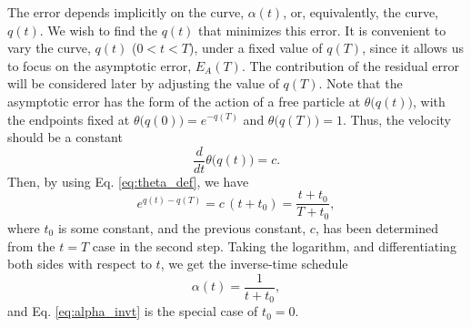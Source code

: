 \documentclass[preprint, superscriptaddress, floatfix]{revtex4-1}
\newcommand{\Err}{E}
\begin{document}
The error depends implicitly on the curve, $\alpha(t)$,
or, equivalently, the curve, $q(t)$.
%
%
We wish to find the $q(t)$
that minimizes this error.
%
It is convenient to
vary the curve, $q(t)$ ($0 < t < T$),
under a fixed value of $q(T)$,
since it allows us to focus on
the asymptotic error, $E_A(T)$.
%
The contribution of the residual error
will be considered later
by adjusting the value of $q(T)$.
%
Note that the asymptotic error
has the form of the action of a free particle
at $\theta\bigl( q(t) \bigr)$,
with the endpoints fixed at
$\theta\bigl( q(0) \bigr)  = e^{- q(T)}$
and
$\theta\bigl( q(T) \bigr) = 1$.
%
Thus, the velocity should be a constant
%
\begin{equation}
  \frac{d}{dt} \theta\bigl( q(t) \bigr) = c
  .
\label{eq:dthetadt_const}
\end{equation}
%
Then, by using Eq. \eqref{eq:theta_def}, we have
%
\begin{equation}
  e^{ q(t) - q(T) }
  =
  c \, (t + t_0)
  =
  \frac{ t + t_0 }
       { T + t_0 }
  ,
\label{eq:expqt}
\end{equation}
%
where $t_0$ is some constant,
and the previous constant, $c$, has been determined
from the $t = T$ case
in the second step.
%
Taking the logarithm,
and differentiating both sides
with respect to $t$,
we get the inverse-time schedule
%
\begin{equation}
  \alpha(t) = \frac{ 1 }{ t + t_0 }
  ,
\label{eq:alpha_invt1}
\end{equation}
%
and Eq. \eqref{eq:alpha_invt} is
the special case of $t_0 = 0$.
%
\end{document}
